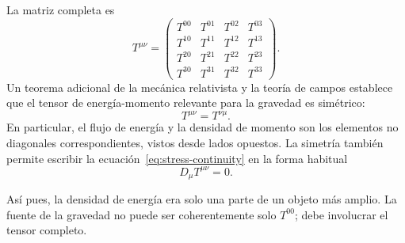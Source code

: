 La matriz completa es
\begin{equation}
 T^{\mu\nu}=
 \begin{pmatrix}
 T^{00}&T^{01}&T^{02}&T^{03}\\
 T^{10}&T^{11}&T^{12}&T^{13}\\
 T^{20}&T^{21}&T^{22}&T^{23}\\
 T^{30}&T^{31}&T^{32}&T^{33}
 \end{pmatrix}.
\end{equation}
Un teorema adicional de la mecánica relativista y la teoría de campos establece que el tensor de energía-momento relevante para la gravedad es simétrico:
\begin{equation}
 T^{\mu\nu}=T^{\nu\mu}.
 \label{eq:stress-symmetry}
\end{equation}
En particular, el flujo de energía y la densidad de momento son los elementos no diagonales correspondientes, vistos desde lados opuestos. La simetría también permite escribir la ecuación~\eqref{eq:stress-continuity} en la forma habitual
\begin{equation}
 D_\mu T^{\mu\nu}=0.
 \label{eq:stress-conservation}
\end{equation}

\begin{classroomqa}
\end{classroomqa}

\begin{classroomqa}
\end{classroomqa}

Así pues, la densidad de energía era solo una parte de un objeto más amplio. La fuente de la gravedad no puede ser coherentemente solo \(T^{00}\); debe involucrar el tensor completo.

